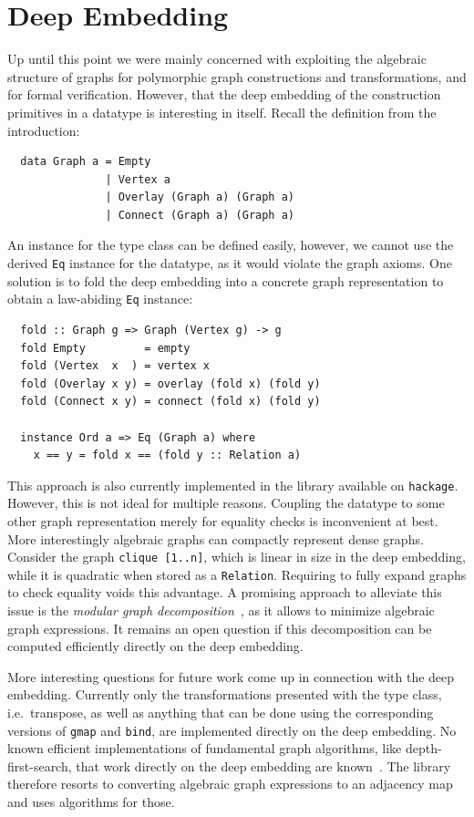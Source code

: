 \documentclass{article}
\newcommand{\hs}{\texttt}
\begin{document}
\section{Deep Embedding}\label{sec:deep}
Up until this point we were mainly concerned with exploiting the algebraic
structure of graphs for polymorphic graph constructions and transformations, and
for formal verification. However, that the deep embedding of the
construction primitives in a datatype is interesting in itself. Recall the
definition from the introduction:
\begin{verbatim}
  data Graph a = Empty
               | Vertex a
               | Overlay (Graph a) (Graph a)
               | Connect (Graph a) (Graph a)
\end{verbatim}
An instance for the type class can be defined easily, however, we cannot use the
derived \hs{Eq} instance for the datatype, as it would violate the graph axioms.
One solution is to fold the deep embedding into a concrete graph representation to
obtain a law-abiding \hs{Eq} instance:
\begin{verbatim}
  fold :: Graph g => Graph (Vertex g) -> g
  fold Empty         = empty
  fold (Vertex  x  ) = vertex x
  fold (Overlay x y) = overlay (fold x) (fold y)
  fold (Connect x y) = connect (fold x) (fold y)

  instance Ord a => Eq (Graph a) where
    x == y = fold x == (fold y :: Relation a)
\end{verbatim}
This approach is also currently implemented in the library available on
\texttt{hackage}. However, this is not ideal for multiple reasons. Coupling the
datatype to some other graph representation merely for equality checks is
inconvenient at best. More interestingly algebraic graphs can compactly
represent dense graphs. Consider the graph \hs{clique [1..n]}, which is linear
in size in the deep embedding, while it is quadratic when stored as a
\hs{Relation}. Requiring to fully expand graphs to check equality voids this
advantage. A promising approach to alleviate this issue is the \textit{modular
  graph decomposition}~\cite{mcconnell2005linear}, as it allows to minimize
algebraic graph expressions. It remains an open question if this decomposition
can be computed efficiently directly on the deep embedding.

More interesting questions for future work come up in connection with the deep
embedding. Currently only the transformations presented with the type class, i.e.\
transpose, as well as anything that can be done using the corresponding versions
of \hs{gmap} and \hs{bind}, are implemented directly on the deep embedding. No
known efficient implementations of fundamental graph algorithms, like
depth-first-search, that work directly on the deep embedding are
known~\cite{mokhov2017algebraic}. The library therefore resorts to converting
algebraic graph expressions to an adjacency map and uses algorithms
for those.
\end{document}
